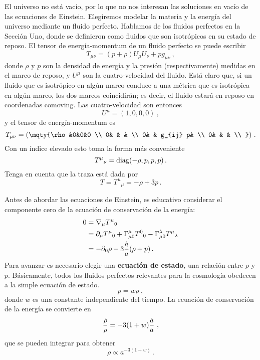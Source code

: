 \documentclass[11pt,b5paper,openany,twoside]{book}
\newcommand{\mn}{{\mu\nu}}
\newcommand{\p}[1]{{\partial_{#1}}}
\begin{document}
El universo no está vacío, por lo que no nos interesan las soluciones en vacío de las ecuaciones de Einstein.
Elegiremos modelar la materia y la energía del universo mediante un fluido perfecto.
Hablamos de los fluidos perfectos en la Sección Uno, donde se definieron como fluidos que son isotrópicos en su estado de reposo.
El tensor de energía-momentum de un fluido perfecto se puede escribir
\begin{equation}
T_{\mn} = (p+\rho)U_\mu U_\nu + pg_\mn\ ,\label{8.15}
\end{equation}
donde $\rho$ y $p$ son la densidad de energía y la presión (respectivamente) medidas en el marco de reposo, y $U^\mu$ son la cuatro-velocidad del fluido.
Está claro que, si un fluido que es isotrópico en algún marco conduce a una métrica que es isotrópica en algún marco, los dos marcos coincidirán; es decir, el fluido estará en reposo en coordenadas comoving.
Las cuatro-velocidad son entonces
\begin{equation}
U^\mu = (1,0,0,0)\ ,\label{8.16}
\end{equation}
y el tensor de energía-momentum es
\begin{equation}
T_\mn = \left(\mqty{\rho &0&0&0 \\  0& & &  \\
0& & g_{ij} p&  \\  0& & &  \\ }\right)\,.\label{8.17}
\end{equation}
Con un índice elevado esto toma la forma más conveniente
\begin{equation}
T^\mu{}_\nu = {\rm diag}(-\rho,p,p,p)\,.\label{8.18}
\end{equation}
Tenga en cuenta que la traza está dada por
\begin{equation}
T = T^\mu{}_\mu = -\rho +3p\,.\label{8.19}
\end{equation}

Antes de abordar las ecuaciones de Einstein, es educativo considerar el componente cero de la ecuación de conservación de la energía:
\begin{align}
0  &=  \nabla_\mu T^\mu{}_0 \notag \\
&=  \p\mu T^\mu{}_0 +\Gamma^\mu_{\mu 0}T^0{}_0
-\Gamma^\lambda_{\mu 0}T^\mu{}_\lambda \notag \\
&=  -\p0\rho -3{{\dot a}\over a}(\rho+p)\,.
\label{8.20}
\end{align}
Para avanzar es necesario elegir una {\bf ecuación de estado}, una relación entre $\rho$ y $p$.
Básicamente, todos los fluidos perfectos relevantes para la cosmología obedecen a la simple ecuación de estado.
\begin{equation}
p=w\rho\ ,\label{8.21}
\end{equation}
donde $w$ es una constante independiente del tiempo.
La ecuación de conservación de la energía se convierte en
\begin{equation}
{{\dot \rho}\over\rho} = -3(1+w){{\dot a}\over{a}}\ ,\label{8.22}
\end{equation}
que se pueden integrar para obtener
\begin{equation}
\rho \propto a^{-3(1+w)}\,.\label{8.23}
\end{equation}
\end{document}
